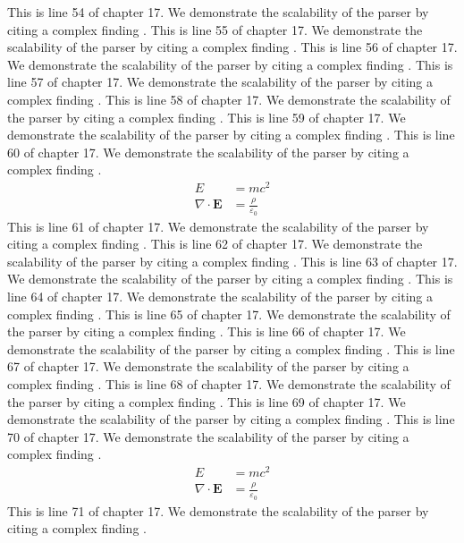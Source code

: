 This is line 54 of chapter 17. We demonstrate the scalability of the parser by citing a complex finding \cite{ref17_54}.
This is line 55 of chapter 17. We demonstrate the scalability of the parser by citing a complex finding \cite{ref17_55}.
This is line 56 of chapter 17. We demonstrate the scalability of the parser by citing a complex finding \cite{ref17_56}.
This is line 57 of chapter 17. We demonstrate the scalability of the parser by citing a complex finding \cite{ref17_57}.
This is line 58 of chapter 17. We demonstrate the scalability of the parser by citing a complex finding \cite{ref17_58}.
This is line 59 of chapter 17. We demonstrate the scalability of the parser by citing a complex finding \cite{ref17_59}.
This is line 60 of chapter 17. We demonstrate the scalability of the parser by citing a complex finding \cite{ref17_60}.
\begin{align*}
  E &= mc^2 \\
  \nabla \cdot \mathbf{E} &= \frac{\rho}{\varepsilon_0}
\end{align*}
This is line 61 of chapter 17. We demonstrate the scalability of the parser by citing a complex finding \cite{ref17_61}.
This is line 62 of chapter 17. We demonstrate the scalability of the parser by citing a complex finding \cite{ref17_62}.
This is line 63 of chapter 17. We demonstrate the scalability of the parser by citing a complex finding \cite{ref17_63}.
This is line 64 of chapter 17. We demonstrate the scalability of the parser by citing a complex finding \cite{ref17_64}.
This is line 65 of chapter 17. We demonstrate the scalability of the parser by citing a complex finding \cite{ref17_65}.
This is line 66 of chapter 17. We demonstrate the scalability of the parser by citing a complex finding \cite{ref17_66}.
This is line 67 of chapter 17. We demonstrate the scalability of the parser by citing a complex finding \cite{ref17_67}.
This is line 68 of chapter 17. We demonstrate the scalability of the parser by citing a complex finding \cite{ref17_68}.
This is line 69 of chapter 17. We demonstrate the scalability of the parser by citing a complex finding \cite{ref17_69}.
This is line 70 of chapter 17. We demonstrate the scalability of the parser by citing a complex finding \cite{ref17_70}.
\begin{align*}
  E &= mc^2 \\
  \nabla \cdot \mathbf{E} &= \frac{\rho}{\varepsilon_0}
\end{align*}
This is line 71 of chapter 17. We demonstrate the scalability of the parser by citing a complex finding \cite{ref17_71}.
